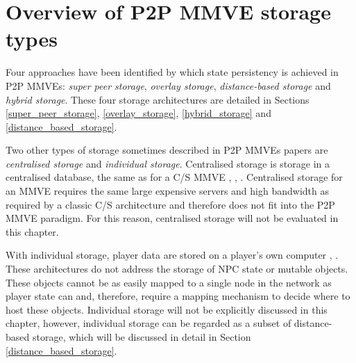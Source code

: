 \section{Overview of P2P MMVE storage types}
\label{storage_type_overview}

Four approaches have been identified by which state persistency is achieved in P2P MMVEs: \emph{super peer storage}, \emph{overlay storage}, \emph{distance-based storage} and \emph{hybrid storage}. These four storage architectures are detailed in Sections \ref{super_peer_storage}, \ref{overlay_storage}, \ref{hybrid_storage} and \ref{distance_based_storage}.

Two other types of storage sometimes described in P2P MMVEs papers are \emph{centralised storage} and \emph{individual storage}. Centralised storage is storage in a centralised database, the same as for a C/S MMVE \cite{badumna_engine}, \cite{rooney_centralised_storage}, \cite{hybrid_p2p_cs_centralised}. Centralised storage for an MMVE requires the same large expensive servers and high bandwidth as required by a classic C/S architecture and therefore does not fit into the P2P MMVE paradigm. For this reason, centralised storage will not be evaluated in this chapter.

With individual storage, player data are stored on a player's own computer \cite{individual_storage1}, \cite{cheat_proof_playout}. These
architectures do not address the storage of NPC state or mutable objects. These objects cannot be as easily mapped to a single node in the network as
player state can and, therefore, require a mapping mechanism to decide where to host these objects. Individual storage will not be explicitly discussed
in this chapter, however, individual storage can be regarded as a subset of distance-based storage, which will be discussed in detail in Section
\ref{distance_based_storage}.

